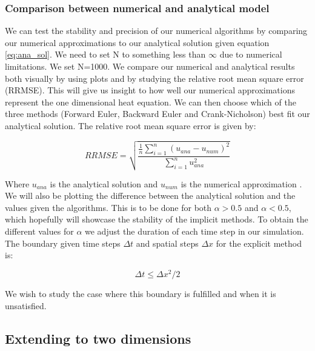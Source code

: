 \documentclass{article}
\begin{document}
\begin{multicols}{2}
\subsubsection{Comparison between numerical and analytical model}

We can test the stability and precision of our numerical algorithms by comparing our numerical approximations to our analytical solution given equation \ref{eq:ana_sol}. We need to set N to something less than $\infty$ due to numerical limitations. We set N=1000. We compare our numerical and analytical results both visually by using plots and by studying the relative root mean square error (RRMSE). This will give us insight to how well our numerical approximations represent the one dimensional heat equation. We can then choose which of the three methods (Forward Euler, Backward Euler and Crank-Nicholson) best fit our analytical solution. The relative root mean square error is given by:

\begin{equation}
RRMSE = \sqrt{\frac{\frac{1}{n}\sum_{i=1}^n(u_{ana}-u_{num})^2}{\sum_{i=1}^n u_{ana}^2}}
\end{equation}

Where $u_{ana}$ is the analytical solution and $u_{num}$ is the numerical approximation \cite{97}. We will also be plotting the difference between the analytical solution and the values given the algorithms. This is to be done for both $\alpha>0.5$ and $\alpha<0.5$, which hopefully will showcase the stability of the implicit methods. To obtain the different values for $\alpha$ we adjust the duration of each time step in our simulation. The boundary given time steps $\Delta t$ and spatial steps $\Delta x$ for the explicit method is:

\begin{equation}
\Delta t \leq \Delta x^2/2
\end{equation}

We wish to study the case where this boundary is fulfilled and when it is unsatisfied. 

\subsection{Extending to two dimensions}


\end{multicols}
\end{document}
